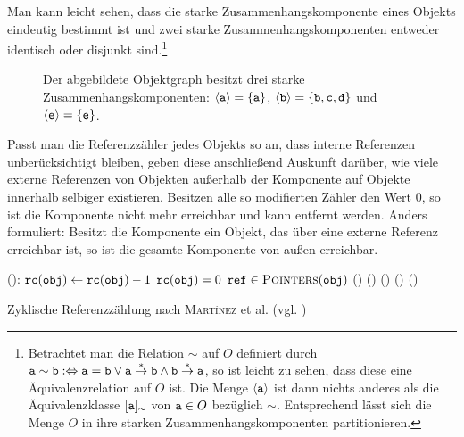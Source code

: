 Man kann leicht sehen, dass die starke Zusammenhangskomponente eines Objekts eindeutig bestimmt ist und zwei starke Zusammenhangskomponenten entweder identisch oder disjunkt sind.\footnote{Betrachtet man die Relation $\sim$ auf $O$ definiert durch $\texttt{a} \sim \texttt{b} :\Leftrightarrow \texttt{a} = \texttt{b} \vee \texttt{a} \overset{*}{\rightarrow} \texttt{b} \wedge \texttt{b} \overset{*}{\rightarrow} \texttt{a}$, so ist leicht zu sehen, dass diese eine Äquivalenzrelation auf $O$ ist. Die Menge $\left\langle\texttt{a}\right\rangle$ ist dann nichts anderes als die Äquivalenzklasse $[\texttt{a}]_{\sim}$ von $\texttt{a} \in O$ bezüglich $\sim$. Entsprechend lässt sich die Menge $O$ in ihre starken Zusammenhangskomponenten partitionieren.}

\begin{figure}[h]
	\centering
	
	\caption[Beispiel für starke Zusammenhangskomponenten]{Der abgebildete Objektgraph besitzt drei starke Zusammenhangskomponenten: $\left\langle\texttt{a}\right\rangle = \{\texttt{a}\}$, $\left\langle\texttt{b}\right\rangle = \{\texttt{b}, \texttt{c}, \texttt{d}\}$ und $\left\langle\texttt{e}\right\rangle = \{\texttt{e}\}$.}
	\label{fig:rc-scc}
\end{figure}

Passt man die Referenzzähler jedes Objekts so an, dass interne Referenzen unberücksichtigt bleiben, geben diese anschließend Auskunft darüber, wie viele externe Referenzen von Objekten außerhalb der Komponente auf Objekte innerhalb selbiger existieren.
Besitzen alle so modifierten Zähler den Wert $0$, so ist die Komponente nicht mehr erreichbar und kann entfernt werden.
Anders formuliert: Besitzt die Komponente ein Objekt, das über eine externe Referenz erreichbar ist, so ist die gesamte Komponente von außen erreichbar.

\begin{algorithm}[h]
\begin{algorithmic}[1]
	\State {}():
	\State \quad $\texttt{rc}(\texttt{obj}) \gets \texttt{rc}(\texttt{obj}) - 1$
	\State \quad \IF $\texttt{rc}(\texttt{obj}) = 0$
	\State \quad \quad \FOREACH $\texttt{ref} \in \textsc{Pointers}(\texttt{obj})$
	\State \quad \quad \quad {}()
	\State \quad \quad {}()
	\State \quad \ELSE
	\State \quad \quad {}()		
	\State \quad \quad {}()		
	\State \quad \quad {}()	
\end{algorithmic}
\caption[Zyklische Referenzzählung]{Zyklische Referenzzählung nach \textsc{Martínez} et al. (vgl. \cite[S. 32]{martinez1990})}
\label{algo:cyclic-rc}
\end{algorithm}

